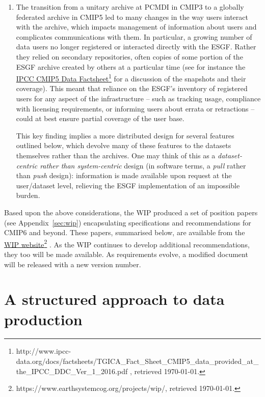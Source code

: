 \documentclass[gmd,manuscript]{copernicus}
\begin{document}
\begin{enumerate}
\item\label{snap} The transition from a unitary archive at PCMDI in
  CMIP3 to a globally federated archive in CMIP5 led to many changes
  in the way users interact with the archive, which impacts management
  of information about users and complicates communications with them.
  In particular, a growing number of data users no longer registered
  or interacted directly with the ESGF. Rather they relied on
  secondary repositories, often copies of some portion of the ESGF
  archive created by others at a particular time (see for instance the
  \href{http://www.ipcc-data.org/docs/factsheets/TGICA_Fact_Sheet_CMIP5_data_provided_at_the_IPCC_DDC_Ver_1_2016.pdf
  }{IPCC CMIP5 Data
    Factsheet}\footnote{http://www.ipcc-data.org/docs/factsheets/TGICA\_Fact\_Sheet\_CMIP5\_data\_provided\_at\_the\_IPCC\_DDC\_Ver\_1\_2016.pdf
    , retrieved \today.} for a discussion of the snapshots and their
  coverage). This meant that reliance on the ESGF's inventory of
  registered users for any aspect of the infrastructure -- such as
  tracking usage, compliance with licensing requirements, or informing
  users about errata or retractions -- could at best ensure partial
  coverage of the user base.

  This key finding implies a more distributed design for several
  features outlined below, which devolve many of these features to the
  datasets themselves rather than the archives. One may think of this
  as a \emph{dataset-centric rather than system-centric} design (in
  software terms, a \emph{pull} rather than \emph{push} design):
  information is made available upon request at the user/dataset
  level, relieving the ESGF implementation of an impossible burden.
\end{enumerate}

Based upon the above considerations, the WIP produced a set of
position papers (see Appendix~\ref{sec:wip}) encapsulating
specifications and recommendations for CMIP6 and beyond. These papers,
summarised below, are available from the
\href{https://www.earthsystemcog.org/projects/wip/}{WIP
  website}\footnote{https://www.earthsystemcog.org/projects/wip/,
  retrieved \today.} . As the WIP continues to develop additional
recommendations, they too will be made available. As requirements
evolve, a modified document will be released with a new version
number.

\section{A structured approach to data production}
\label{sec:dreq}
\end{document}
